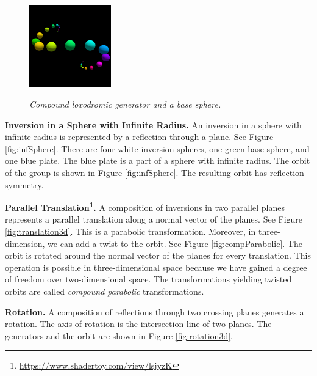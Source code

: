 \begin{figure}[h!tbp]
\begin{minipage}[t]{0.5\hsize}
 \hspace*{\fill}
  \begin{minipage}[t]{0.25\hsize}
   \center
   \includegraphics[width=1.4in, height=1.4in, keepaspectratio]{./img/application/3dGen/compLoxoOneOrb.pdf}
   \label{fig:compLoxoOrb}
  \end{minipage}
  \hspace*{\fill}
  \caption{\textit{Compound loxodromic generator and a base sphere.}}
  \label{fig:compLoxo}
 \end{minipage}
\end{figure}

\noindent\textbf{Inversion in a Sphere with Infinite Radius.}
An inversion in a sphere with infinite radius is represented by
a reflection through a plane.
See Figure \ref{fig:infSphere}.
There are four white inversion spheres, one green base sphere,
and one blue plate.
The blue plate is a part of a sphere with infinite radius.
The orbit of the group is shown in Figure
\ref{fig:infSphere}.
The resulting orbit has reflection symmetry.

\noindent\textbf{Parallel
Translation\footnote{\url{https://www.shadertoy.com/view/lsjyzK}}.}
A composition of inversions in two parallel planes represents a parallel
translation along a normal vector of the planes.
See Figure \ref{fig:translation3d}.
This is a parabolic transformation.
Moreover, in three-dimension, we can add a twist to the orbit.
See Figure \ref{fig:compParabolic}.
The orbit is rotated around the normal vector of the planes for every
translation.
This operation is possible in three-dimensional space because we have gained a degree
of freedom over two-dimensional space.
The transformations yielding twisted orbits are called \textit{compound
parabolic} transformations.

\noindent\textbf{Rotation.}
A composition of reflections through two crossing planes generates a rotation.
The axis of rotation is the intersection line of two planes.
The generators and the orbit are shown in Figure \ref{fig:rotation3d}.

